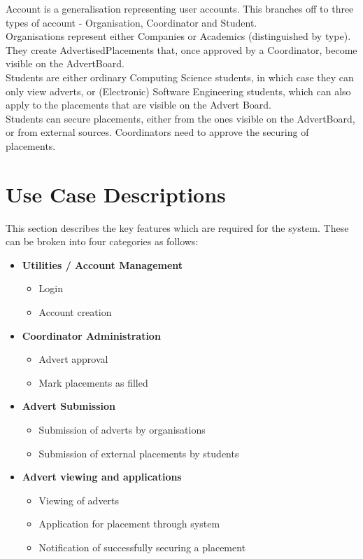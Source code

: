 \documentclass{l3deliverable}
\begin{document}
Account is a generalisation representing user accounts. This branches off to three types of account - Organisation, Coordinator and Student.\\

Organisations represent either Companies or Academics (distinguished by type). They create AdvertisedPlacements that, once approved by a Coordinator, become visible on the AdvertBoard.\\

Students are either ordinary Computing Science students, in which case they can only view adverts, or (Electronic) Software Engineering students, which can also apply to the placements that are visible on the Advert Board.\\

Students can secure placements, either from the ones visible on the AdvertBoard, or from external sources. Coordinators need to approve the securing of placements.


\newpage
\section{Use Case Descriptions}
This section describes the key features which are required for the system. These can be broken into four categories as follows:\
\begin{itemize}
\item{\textbf{Utilities / Account Management}
	\begin{itemize}
		\item{Login}
		\item{Account creation}
	\end{itemize}}
\item{\textbf{Coordinator Administration}
	\begin{itemize}
		\item{Advert approval}
		\item{Mark placements as filled}
	\end{itemize}}
\item{\textbf{Advert Submission}
	\begin{itemize}
		\item{Submission of adverts by organisations}
		\item{Submission of external placements by students}
	\end{itemize}}
\item{\textbf{Advert viewing and applications}
	\begin{itemize}
		\item{Viewing of adverts}
		\item{Application for placement through system}
		\item{Notification of successfully securing a placement}
	\end{itemize}}
\end{itemize}
\end{document}
